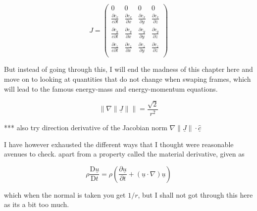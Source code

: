 \begin{equation}
	J =
	\begin{pmatrix}
		0                                 & 0                               & 0                               & 0                               \\
		\frac{\partial c_x}{c \partial t} & \frac{\partial c_x}{\partial x} & \frac{\partial c_x}{\partial y} & \frac{\partial c_x}{\partial z} \\
		\frac{\partial c_y}{c \partial t} & \frac{\partial c_y}{\partial x} & \frac{\partial c_y}{\partial y} & \frac{\partial c_y}{\partial z} \\
		\frac{\partial c_z}{c \partial t} & \frac{\partial c_z}{\partial x} & \frac{\partial c_z}{\partial y} & \frac{\partial c_z}{\partial z} \\
	\end{pmatrix}
\end{equation}

But instead of going through this, I will end the madness of this chapter here and move on to looking at quantities that do not change when swaping frames, which will lead to the famous energy-mass and energy-momentum equations.

\begin{equation}
	\big\| \nabla \|\underline{J}\| \big\| = \frac{\sqrt{2}}{r^2}
\end{equation}

*** also try direction derivative of the Jacobian norm $ \nabla \|\underline{J}\| \cdot \hat{\underline{c}}$

I have however exhausted the different ways that I thought were reasonable avenues to check. apart from a property called the material derivative, given as

\begin{equation}
	\rho {\frac {\mathrm {D} \underline {u} }{\mathrm {D} t}}=\rho \left({\frac {\partial \underline {u} }{\partial t}}+(\underline {u} \cdot \nabla )\underline {u} \right)
\end{equation}

which when the normal is taken you get $1/r$, but I shall not got through this here as its a bit too much.






